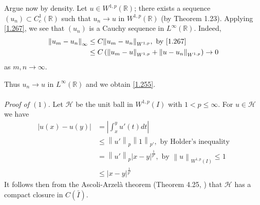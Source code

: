 \documentclass[a4paper,oneside]{book}
\numberwithin{equation}{chapter}
\begin{document}
Argue now by density. Let $u\in W^{1,p}\left(\mathbb{R}\right)$; there exists a sequence $\left(u_n\right)\subset C_c^1\left(\mathbb{R}\right)$ such that $u_n\to u$ in $W^{1,p}\left(\mathbb{R}\right)$ (by Theorem 1.23). Applying \eqref{1.267}, we see that $\left(u_n\right)$ is a Cauchy sequence in $L^{\infty}\left(\mathbb{R}\right)$. Indeed, 
\begin{align}
{\left\| {{u_m} - {u_n}} \right\|_\infty } &\le C{\left\| {{u_m} - {u_n}} \right\|_{{W^{1,p}}}},\mbox{ by \eqref{1.267}}\\
 &\le C\left( {{{\left\| {{u_m} - u} \right\|}_{{W^{1,p}}}} + {{\left\| {u - {u_n}} \right\|}_{{W^{1,p}}}}} \right) \to 0
\end{align}
as $m,n\to \infty$.

Thus $u_n\to u$ in $L^{\infty}\left(\mathbb{R}\right)$ and we obtain \eqref{1.255}.\\
\\
\textit{Proof of $\left(1\right)$.} Let $\mathcal{H}$ be the unit ball in $W^{1,p}\left(I\right)$ with $1<p\le \infty$. For $u\in \mathcal{H}$ we have
\begin{align}
\label{1.293}
\left| {u\left( x \right) - u\left( y \right)} \right| &= \left| {\int_x^y {u'\left( t \right)dt} } \right|\\
 &\le {\left\| {u'} \right\|_p}{\left\| 1 \right\|_{p'}},\mbox{ by Holder's inequality}\\
 &= {\left\| {u'} \right\|_p}{\left| {x - y} \right|^{\frac{1}{{p'}}}},\mbox{ by }{\left\| u \right\|_{{W^{1,p}}\left( I \right)}} \le 1\\
& \le {\left| {x - y} \right|^{\frac{1}{{p'}}}} \label{1.296}
\end{align}
It follows then from the Ascoli-Arzel\`{a} theorem (Theorem 4.25, \cite{1}) that $\mathcal{H}$ has a compact closure in $C\left(\bar{I}\right)$. 
\end{document}
